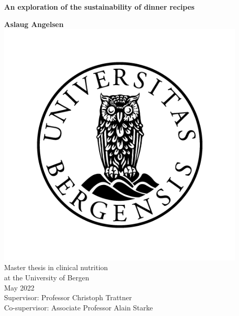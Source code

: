 \thispagestyle{empty}

\begin{titlepage}

\begin{center}

\vspace*{2em}
        \fontsize{25}{24}
        \textbf{An exploration of the sustainability of dinner recipes}
        
        \vspace{0.5cm}
        \large\textbf{Aslaug Angelsen}
        \vspace{0.5cm}\\
		    \includegraphics[width=120mm]{images/emblem}
		    \vspace{0.5cm}\\
		    Master thesis in clinical nutrition\\
		    at the University of Bergen\\
		    May 2022\\
		    \vspace{1.5cm}
		    Supervisor: Professor Christoph Trattner\\
		    Co-supervisor: Associate Professor Alain Starke\\
		    \vspace{0.5cm}
      	\huge\date{2022}
      	
\end{center}
\end{titlepage}
\afterpage{\blankpage}


